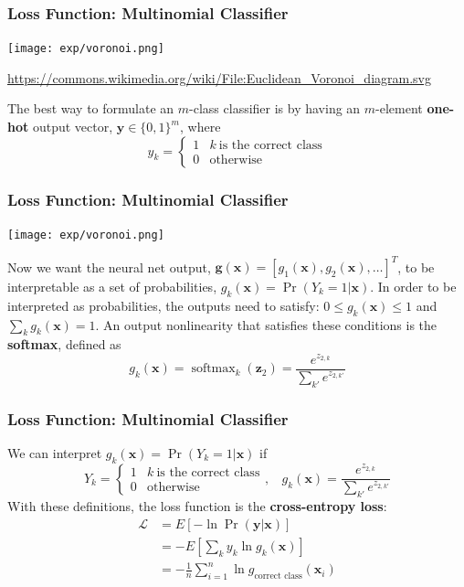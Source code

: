 \documentclass{beamer}
\DeclareMathOperator*{\softmax}{softmax}
\begin{document}
\begin{frame}
  \frametitle{Loss Function: Multinomial Classifier}

  \centerline{\texttt{[image: exp/voronoi.png]}}
  {\footnotesize\url{https://commons.wikimedia.org/wiki/File:Euclidean_Voronoi_diagram.svg}}
  
  The best way to formulate an $m$-class classifier is by having an
  $m$-element {\bf one-hot} output vector, $\mathbf{y}\in\{0,1\}^m$,
  where
  \begin{displaymath}
    y_k=\begin{cases}
    1 & k~\text{is the correct class}\\
    0 & \mbox{otherwise}
    \end{cases}
  \end{displaymath}
\end{frame}

\begin{frame}
  \frametitle{Loss Function: Multinomial Classifier}
  
  \centerline{\texttt{[image: exp/voronoi.png]}}
  
  Now we want the neural net output,
  $\mathbf{g}(\mathbf{x})=[g_1(\mathbf{x}),g_2(\mathbf{x}),\ldots]^T$,
  to be interpretable as a set of probabilities,
  $g_k(\mathbf{x})=\Pr(Y_k=1|\mathbf{x})$.  In order to be interpreted
  as probabilities, the outputs need to satisfy: $0\le
  g_k(\mathbf{x})\le 1$ and $\sum_{k} g_k(\mathbf{x})=1$.  An
  output nonlinearity that satisfies these conditions is the {\bf
    softmax}, defined as
  \begin{displaymath}
    g_k(\mathbf{x}) = \softmax_k(\mathbf{z}_2) =
    \frac{e^{z_{2,k}}}{\sum_{k'} e^{z_{2,k'}}}
  \end{displaymath}
\end{frame}
    
\begin{frame}
  \frametitle{Loss Function: Multinomial Classifier}

  We can interpret
  $g_k(\mathbf{x})=\Pr(Y_k=1|\mathbf{x})$ if
  \begin{displaymath}
    Y_k=\begin{cases}
    1 & k~\text{is the correct class}\\
    0 & \mbox{otherwise}
    \end{cases},~~~~
    g_k(\mathbf{x}) = \frac{e^{z_{2,k}}}{\sum_{k'} e^{z_{2,k'}}}
  \end{displaymath}
  With these definitions, the loss function is the {\bf cross-entropy loss}:
  \begin{align*}
    \mathcal{L}
    &= E\left[-\ln\Pr(\mathbf{y}|\mathbf{x})\right]\\
    &= -E\left[\sum_k y_k\ln g_k(\mathbf{x})\right]\\
    &= -\frac{1}{n}\sum_{i=1}^n \ln g_{\text{correct class}}(\mathbf{x}_i)
  \end{align*}
\end{frame}
\end{document}
